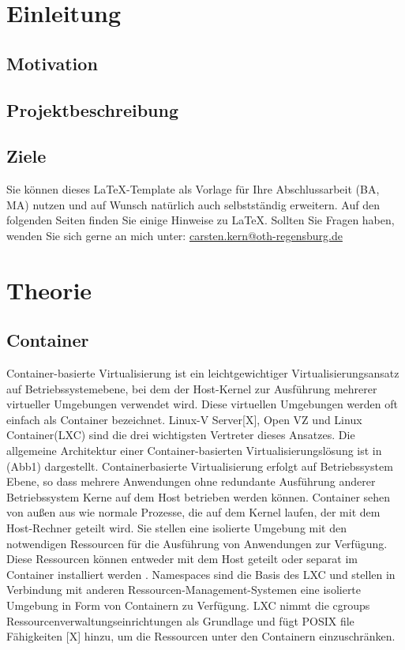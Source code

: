 \documentclass[12pt,a4paper,bibliography=totocnumbered,listof=totocnumbered]{scrartcl}
\begin{document}
\section{Einleitung}
\subsection{Motivation}
\subsection{Projektbeschreibung}
\subsection{Ziele}
Sie können dieses \LaTeX-Template als Vorlage für Ihre Abschlussarbeit (\ac{BA}, \ac{MA}) nutzen und auf Wunsch natürlich auch selbstständig erweitern. Auf den folgenden Seiten finden Sie einige Hinweise zu \LaTeX. Sollten Sie Fragen haben, wenden Sie sich gerne an mich unter: \url{carsten.kern@oth-regensburg.de} 



\pagebreak
\section{Theorie}
\subsection{Container}
Container-basierte Virtualisierung ist ein leichtgewichtiger Virtualisierungsansatz auf Betriebssystemebene, bei dem der Host-Kernel zur Ausführung mehrerer virtueller Umgebungen verwendet wird. Diese virtuellen Umgebungen werden oft einfach als \glqq Container \grqq{} bezeichnet. Linux-V Server[X], Open VZ\cite{IndexOpenvz.org} und Linux Container(LXC)\cite{IndexLinuxcontainers.Org} sind die drei wichtigsten Vertreter dieses Ansatzes. Die allgemeine Architektur einer Container-basierten Virtualisierungslösung ist in (Abb1) dargestellt. Containerbasierte Virtualisierung erfolgt auf Betriebssystem Ebene, so dass mehrere Anwendungen ohne redundante Ausführung anderer Betriebssystem Kerne auf dem Host betrieben werden können. Container sehen von außen aus wie normale Prozesse, die auf dem Kernel laufen, der mit dem Host-Rechner geteilt wird. Sie stellen eine isolierte Umgebung mit den notwendigen Ressourcen für die Ausführung von Anwendungen zur Verfügung. Diese Ressourcen können entweder mit dem Host geteilt oder separat im Container installiert werden \cite{Xavier2014AClusters}. Namespaces sind die Basis des LXC und stellen in Verbindung mit anderen Ressourcen-Management-Systemen eine isolierte Umgebung in Form von Containern zu Verfügung. LXC nimmt die cgroups Ressourcenverwaltungseinrichtungen\cite{ControlDocumentation} als Grundlage und fügt POSIX file Fähigkeiten [X] hinzu, um die Ressourcen unter den Containern einzuschränken. 
\end{document}
